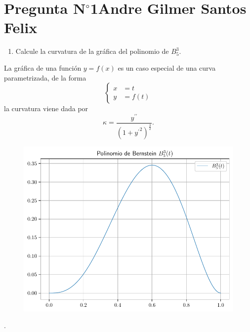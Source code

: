 \section{Pregunta N$^{\circ}$1\qquad Andre Gilmer Santos Felix}

\begin{frame}
    \begin{enumerate}\setcounter{enumi}{0}
        \item

              Calcule la curvatura de la gráfica del polinomio de
              $B^{3}_{5}$.
    \end{enumerate}

    \begin{solution}
        La gráfica de una función $y=f\left(x\right)$ es un caso
        especial de una curva parametrizada, de la forma
        \begin{equation*}
            \begin{cases}
                x & =t               \\
                y & =f\left(t\right)
            \end{cases}
        \end{equation*}
        la curvatura viene dada por
        \begin{equation*}
            \kappa=
            \dfrac{
                y^{\prime\prime}
            }{
                {\left(1+{y^{\prime}}^{2}\right)}^{\frac{3}{2}}
            }.
        \end{equation*}

        \begin{figure}[ht!]
            \centering
            \includegraphics[width=.4\paperwidth]{p1}
        \end{figure}
    \end{solution}
\end{frame}

\begin{frame}
    \begin{solution}
        .
    \end{solution}
\end{frame}